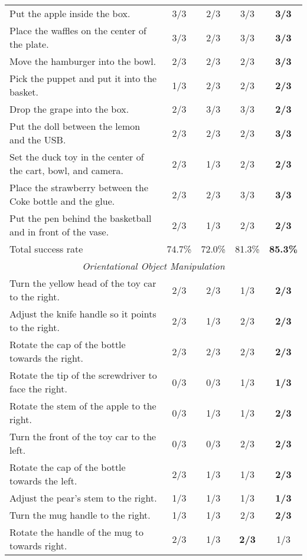 \begin{table*}[t!]
{\begin{tabular}{lcccc}
    Put the apple inside the box. & 3/3 & 2/3 & 3/3 & \textbf{3/3} \\
    Place the waffles on the center of the plate. & 3/3 & 2/3 & 3/3 & \textbf{3/3} \\
    Move the hamburger into the bowl.& 2/3 & 2/3 & 2/3 & \textbf{3/3} \\
    Pick the puppet and put it into the basket. & 1/3 & 2/3 & 2/3 & \textbf{2/3} \\
    Drop the grape into the box. & 2/3 & 3/3 & 3/3 & \textbf{2/3} \\
    Put the doll between the lemon and the USB. & 2/3 & 2/3 & 2/3 & \textbf{3/3} \\
    Set the duck toy in the center of the cart, bowl, and camera. & 2/3 & 1/3 & 2/3 & \textbf{2/3} \\
    Place the strawberry between the Coke bottle and the glue. & 2/3 & 2/3 & 3/3 & \textbf{3/3} \\
    Put the pen behind the basketball and in front of the vase. & 2/3 & 1/3 & 2/3 & \textbf{2/3} \\
    Total success rate& 74.7\% & 72.0\% & 81.3\% & \textbf{85.3\%} \\
    \midrule
    \multicolumn{5}{c}{\textit{Orientational Object Manipulation}}\\
    \midrule
    Turn the yellow head of the toy car to the right. & 2/3 & 2/3 & 1/3 & \textbf{2/3} \\
    Adjust the knife handle so it points to the right. & 2/3 & 1/3 & 2/3 & \textbf{2/3} \\
    Rotate the cap of the bottle towards the right. & 2/3 & 2/3 & 2/3 & \textbf{2/3}\\
    Rotate the tip of the screwdriver to face the right. & 0/3 & 0/3 & 1/3 & \textbf{1/3}\\
    Rotate the stem of the apple to the right. & 0/3 & 1/3 & 1/3 & \textbf{2/3}\\
    Turn the front of the toy car to the left. & 0/3 & 0/3 & 2/3 & \textbf{2/3} \\
    Rotate the cap of the bottle towards the left. & 2/3 & 1/3 & 1/3 & \textbf{2/3}\\
    Adjust the pear's stem to the right. & 1/3 & 1/3 & 1/3 & \textbf{1/3}\\
    Turn the mug handle to the right. & 1/3 & 1/3 & 2/3 & \textbf{2/3}\\
    Rotate the handle of the mug to towards right.& 2/3 & 1/3 &\textbf{2/3} & 1/3\\

\end{tabular}}
\end{table*}
